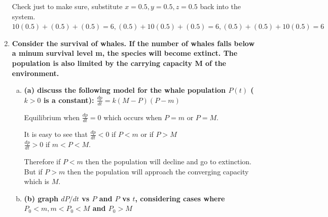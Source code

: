\documentclass{article}
\begin{document}
\begin{enumerate}[1.]
Check just to make sure, substitute $x=0.5, y = 0.5, z = 0.5$ back into the system. $10 (0.5) + (0.5) + (0.5) = 6, (0.5) + 10(0.5) + (0.5) = 6, (0.5) + (0.5) + 10(0.5) = 6$

\item \textbf{Consider the survival of whales. If the number of whales falls below a minum survival
level m, the species will become extinct. The population is also limited by the carrying
capacity M of the environment.}

\begin{enumerate}[(a)]
\item \textbf{(a) discuss the following model for the whale population $P(t)$ ($k > 0$ is a constant):
$\frac{dp}{dt} = k(M - P)(P - m)$}

Equilibrium when $\frac{dp}{dt} = 0$ which occurs when $P = m$ or $P = M$.

It is easy to see that $\frac{dp}{dt} < 0 $ if $P < m$ or if $P > M$ \\
$\frac{dp}{dt} > 0$ if $m < P < M$.

Therefore if $P < m$ then the population will decline and go to extinction. But if $P > m$ then the population will approach the converging capacity which is $M$.


\item \textbf{(b) graph $dP/dt$ vs $P$ and $P$ vs $t$, considering cases where $P_0 < m, m < P_0 < M$ and
$P_0 > M$}


\usetikzlibrary{intersections}


\end{enumerate}
\end{enumerate}
\end{document}
